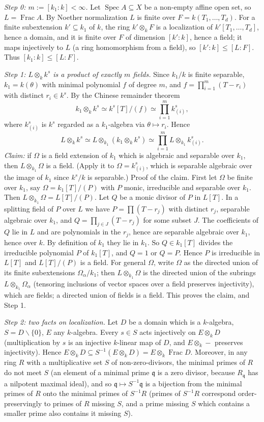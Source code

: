 \documentclass[11pt]{article}
\begin{document}
\emph{Step 0: $m:=[k_1:k]<\infty$.} Let $\operatorname{Spec}A\subseteq X$ be a non-empty affine open set, so $L=\operatorname{Frac}A$. By Noether normalization $L$ is finite over $F=k(T_1,\dots,T_d)$. For a finite subextension $k'\subseteq k_1$ of $k$, the ring $k'\otimes_kF$ is a localization of $k'[T_1,\dots,T_d]$, hence a domain, and it is finite over $F$ of dimension $[k':k]$, hence a field; it maps injectively to $L$ (a ring homomorphism from a field), so $[k':k]\le[L:F]$. Thus $[k_1:k]\le[L:F]$.

\emph{Step 1: $L\otimes_kk^s$ is a product of exactly $m$ fields.} Since $k_1/k$ is finite separable, $k_1=k(\theta)$ with minimal polynomial $f$ of degree $m$, and $f=\prod_{i=1}^m(T-r_i)$ with distinct $r_i\in k^s$. By the Chinese remainder theorem
\[ k_1\otimes_kk^s\simeq k^s[T]/(f)\simeq\prod_{i=1}^m k^s_{(i)}, \]
where $k^s_{(i)}$ is $k^s$ regarded as a $k_1$-algebra via $\theta\mapsto r_i$. Hence
\[ L\otimes_kk^s\simeq L\otimes_{k_1}(k_1\otimes_kk^s)\simeq\prod_{i=1}^mL\otimes_{k_1}k^s_{(i)}. \]
\emph{Claim:} if $\Omega$ is a field extension of $k_1$ which is algebraic and separable over $k_1$, then $L\otimes_{k_1}\Omega$ is a field. (Apply it to $\Omega=k^s_{(i)}$, which is separable algebraic over the image of $k_1$ since $k^s/k$ is separable.) Proof of the claim. First let $\Omega$ be finite over $k_1$, say $\Omega=k_1[T]/(P)$ with $P$ monic, irreducible and separable over $k_1$. Then $L\otimes_{k_1}\Omega=L[T]/(P)$. Let $Q$ be a monic divisor of $P$ in $L[T]$. In a splitting field of $P$ over $L$ we have $P=\prod(T-r_j)$ with distinct $r_j$, separable algebraic over $k_1$, and $Q=\prod_{j\in J}(T-r_j)$ for some subset $J$. The coefficients of $Q$ lie in $L$ and are polynomials in the $r_j$, hence are separable algebraic over $k_1$, hence over $k$. By definition of $k_1$ they lie in $k_1$. So $Q\in k_1[T]$ divides the irreducible polynomial $P$ of $k_1[T]$, and $Q=1$ or $Q=P$. Hence $P$ is irreducible in $L[T]$ and $L[T]/(P)$ is a field. For general $\Omega$, write $\Omega$ as the directed union of its finite subextensions $\Omega_\alpha/k_1$; then $L\otimes_{k_1}\Omega$ is the directed union of the subrings $L\otimes_{k_1}\Omega_\alpha$ (tensoring inclusions of vector spaces over a field preserves injectivity), which are fields; a directed union of fields is a field. This proves the claim, and Step 1.

\emph{Step 2: two facts on localization.} Let $D$ be a domain which is a $k$-algebra, $S=D\smallsetminus\{0\}$, $E$ any $k$-algebra. Every $s\in S$ acts injectively on $E\otimes_kD$ (multiplication by $s$ is an injective $k$-linear map of $D$, and $E\otimes_k-$ preserves injectivity). Hence $E\otimes_kD\subseteq S^{-1}(E\otimes_kD)=E\otimes_k\operatorname{Frac}D$. Moreover, in any ring $R$ with a multiplicative set $S$ of non-zero-divisors, the minimal primes of $R$ do not meet $S$ (an element of a minimal prime $\mathfrak q$ is a zero divisor, because $R_{\mathfrak q}$ has a nilpotent maximal ideal), and so $\mathfrak q\mapsto S^{-1}\mathfrak q$ is a bijection from the minimal primes of $R$ onto the minimal primes of $S^{-1}R$ (primes of $S^{-1}R$ correspond order-preservingly to primes of $R$ missing $S$, and a prime missing $S$ which contains a smaller prime also contains it missing $S$).
\end{document}
